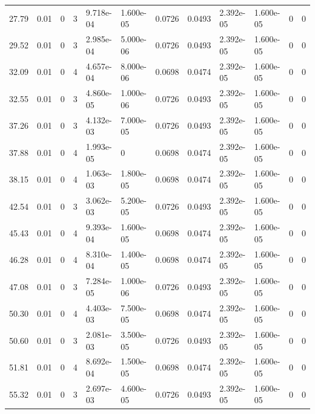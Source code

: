 \documentclass[preview]{standalone}
\begin{document}
{{\begin{tabular}{L{1.2cm}C{1.2cm} C{0.3cm}C{0.5cm} C{1.4cm}C{1.4cm} C{1.4cm}C{1.4cm} C{1.6cm}C{1.6cm} C{1.6cm}C{1.6cm}}
  27.79  &  0.01  & 0     &  3 &  9.718e-04  & 1.600e-05  &  0.0726&   0.0493& 2.392e-05 & 1.600e-05   &  0 & 0  \\ 
  29.52  &  0.01  & 0     &  3 &  2.985e-04  & 5.000e-06  &  0.0726&   0.0493& 2.392e-05 & 1.600e-05   &  0 & 0  \\ 
  32.09  &  0.01  & 0     &  4 &  4.657e-04  & 8.000e-06  &  0.0698&   0.0474& 2.392e-05 & 1.600e-05   &  0 & 0  \\ 
  32.55  &  0.01  & 0     &  3 &  4.860e-05  & 1.000e-06  &  0.0726&   0.0493& 2.392e-05 & 1.600e-05   &  0 & 0  \\ 
  37.26  &  0.01  & 0     &  3 &  4.132e-03  & 7.000e-05  &  0.0726&   0.0493& 2.392e-05 & 1.600e-05   &  0 & 0  \\ 
  37.88  &  0.01  & 0     &  4 &  1.993e-05  & 0  &  0.0698&   0.0474& 2.392e-05 & 1.600e-05   &  0 & 0  \\ 
  38.15  &  0.01  & 0     &  4 &  1.063e-03  & 1.800e-05  &  0.0698&   0.0474& 2.392e-05 & 1.600e-05   &  0 & 0  \\ 
  42.54  &  0.01  & 0     &  3 &  3.062e-03  & 5.200e-05  &  0.0726&   0.0493& 2.392e-05 & 1.600e-05   &  0 & 0  \\ 
  45.43  &  0.01  & 0     &  4 &  9.393e-04  & 1.600e-05  &  0.0698&   0.0474& 2.392e-05 & 1.600e-05   &  0 & 0  \\ 
  46.28  &  0.01  & 0     &  4 &  8.310e-04  & 1.400e-05  &  0.0698&   0.0474& 2.392e-05 & 1.600e-05   &  0 & 0  \\ 
  47.08  &  0.01  & 0     &  3 &  7.284e-05  & 1.000e-06  &  0.0726&   0.0493& 2.392e-05 & 1.600e-05   &  0 & 0  \\ 
  50.30  &  0.01  & 0     &  4 &  4.403e-03  & 7.500e-05  &  0.0698&   0.0474& 2.392e-05 & 1.600e-05   &  0 & 0  \\ 
  50.60  &  0.01  & 0     &  3 &  2.081e-03  & 3.500e-05  &  0.0726&   0.0493& 2.392e-05 & 1.600e-05   &  0 & 0  \\ 
  51.81  &  0.01  & 0     &  4 &  8.692e-04  & 1.500e-05  &  0.0698&   0.0474& 2.392e-05 & 1.600e-05   &  0 & 0  \\ 
  55.32  &  0.01  & 0     &  3 &  2.697e-03  & 4.600e-05  &  0.0726&   0.0493& 2.392e-05 & 1.600e-05   &  0 & 0  \\ 
\hline 
\end{tabular} 

}}
\end{document}

